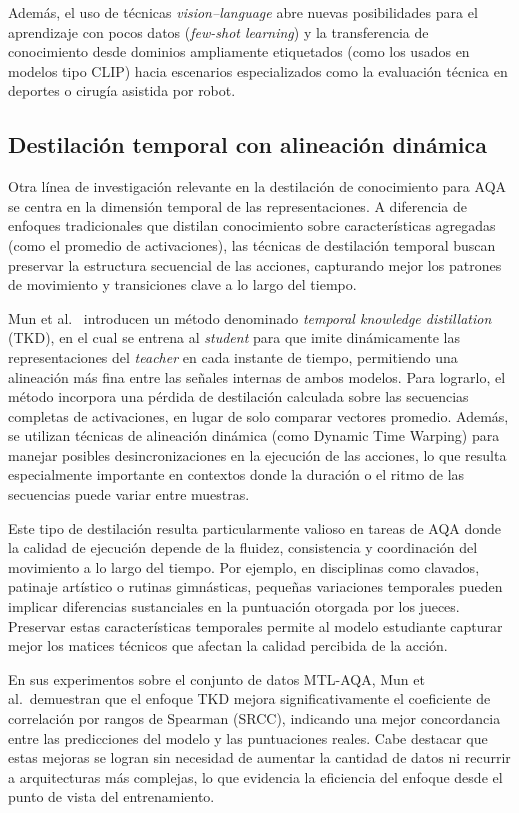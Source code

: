 Además, el uso de técnicas \textit{vision--language} abre nuevas posibilidades para el aprendizaje con pocos datos (\textit{few-shot learning}) y la transferencia de conocimiento desde dominios ampliamente etiquetados (como los usados en modelos tipo CLIP) hacia escenarios especializados como la evaluación técnica en deportes o cirugía asistida por robot.


\subsection{Destilación temporal con alineación dinámica}

Otra línea de investigación relevante en la destilación de conocimiento para AQA se centra en la dimensión temporal de las representaciones. A diferencia de enfoques tradicionales que distilan conocimiento sobre características agregadas (como el promedio de activaciones), las técnicas de destilación temporal buscan preservar la estructura secuencial de las acciones, capturando mejor los patrones de movimiento y transiciones clave a lo largo del tiempo.

Mun et al.~\cite{Mun2019TKD} introducen un método denominado \textit{temporal knowledge distillation} (TKD), en el cual se entrena al \textit{student} para que imite dinámicamente las representaciones del \textit{teacher} en cada instante de tiempo, permitiendo una alineación más fina entre las señales internas de ambos modelos. Para lograrlo, el método incorpora una pérdida de destilación calculada sobre las secuencias completas de activaciones, en lugar de solo comparar vectores promedio. Además, se utilizan técnicas de alineación dinámica (como Dynamic Time Warping) para manejar posibles desincronizaciones en la ejecución de las acciones, lo que resulta especialmente importante en contextos donde la duración o el ritmo de las secuencias puede variar entre muestras.

Este tipo de destilación resulta particularmente valioso en tareas de AQA donde la calidad de ejecución depende de la fluidez, consistencia y coordinación del movimiento a lo largo del tiempo. Por ejemplo, en disciplinas como clavados, patinaje artístico o rutinas gimnásticas, pequeñas variaciones temporales pueden implicar diferencias sustanciales en la puntuación otorgada por los jueces. Preservar estas características temporales permite al modelo estudiante capturar mejor los matices técnicos que afectan la calidad percibida de la acción.

En sus experimentos sobre el conjunto de datos MTL-AQA, Mun et al.~demuestran que el enfoque TKD mejora significativamente el coeficiente de correlación por rangos de Spearman (SRCC), indicando una mejor concordancia entre las predicciones del modelo y las puntuaciones reales. Cabe destacar que estas mejoras se logran sin necesidad de aumentar la cantidad de datos ni recurrir a arquitecturas más complejas, lo que evidencia la eficiencia del enfoque desde el punto de vista del entrenamiento.

